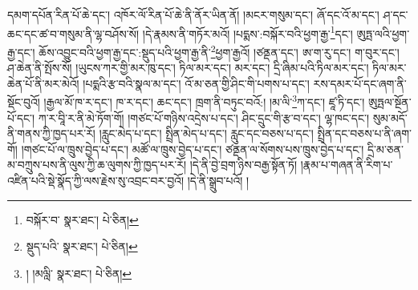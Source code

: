 དམག་དཔོན་རིན་པོ་ཆེ་དང་། འཁོར་ལོ་རིན་པོ་ཆེ་ནི་ནོར་ཡིན་ནོ། །མངར་གསུམ་དང་། ཞོ་དང་འོ་མ་དང་། ཤ་དང་ཆང་དང་ཚ་བ་གསུམ་ནི་ལྷ་བཤོས་སོ། །དེ་རྣམས་ནི་གཏོར་མའོ། །པདྨས་:བསྐོར་བའི་ཕྱག་རྒྱ་\footnote{བསྐོར་བ་  སྣར་ཐང་།  པེ་ཅིན། }དང་། ཨུཏྤ་ལའི་ཕྱག་རྒྱ་དང་། ཆོས་འབྱུང་བའི་ཕྱག་རྒྱ་དང་:སྡུད་པའི་ཕྱག་རྒྱ་ནི་\footnote{སྡུད་པའི་  སྣར་ཐང་།  པེ་ཅིན། }ཕྱག་རྒྱའོ། །ཙནྡན་དང་། ཨ་ག་རུ་དང་། ག་བུར་དང་། ཤ་ཆེན་ནི་སྤོས་སོ། །ཡུངས་ཀར་གྱི་མར་ཁུ་དང་། ཏིལ་མར་དང་། མར་དང་། དྲི་ཞིམ་པའི་ཏིལ་མར་དང་། ཏིལ་མར་ཆེན་པོ་ནི་མར་མེའོ། །པདྨའི་རྩ་བའི་སྣལ་མ་དང་། འོ་མ་ཅན་གྱི་ཤིང་གི་པགས་པ་དང་། རས་དམར་པོ་དང་ཞག་ནི་སྡོང་བུའོ། །རྒྱལ་མོ་ཁ་ར་དང་། ཁ་ར་དང་། ཆང་དང་། ཁྲག་ནི་བཏུང་བའོ:། །མ་ལི་\footnote{། །མལླི་  སྣར་ཐང་།  པེ་ཅིན། }ཀ་དང་། ཛཱ་ཏི་དང་། ཨུཏྤལ་སྔོན་པོ་དང་། ཀ་ར་བཱི་ར་ནི་མེ་ཏོག་གོ། །གཙང་པོ་གཉིས་འདྲེས་པ་དང་། ཤིང་དྲུང་གི་རྩ་བ་དང་། ལྷ་ཁང་དང་། སུམ་མདོ་ནི་གནས་ཀྱི་ཁྱད་པར་རོ། །རླུང་མེད་པ་དང་། སྤྲིན་མེད་པ་དང་། རླུང་དང་བཅས་པ་དང་། སྤྲིན་དང་བཅས་པ་ནི་ཞག་གོ། །གཙང་པོ་ལ་ཁྲུས་བྱེད་པ་དང་། མཚོ་ལ་ཁྲུས་བྱེད་པ་དང་། ཙནྡན་ལ་སོགས་པས་ཁྲུས་བྱེད་པ་དང་། དྲི་མ་ཅན་མ་བཀྲུས་པས་ནི་ལུས་ཀྱི་ཆ་ལུགས་ཀྱི་ཁྱད་པར་རོ། །དེ་ནི་བྱེ་བྲག་ཉིས་བརྒྱ་སྟོན་ཏོ། །རྣམ་པ་གཞན་ནི་རིག་པ་འཛིན་པའི་སྡེ་སྣོད་ཀྱི་ལས་རྗེས་སུ་འབྲང་བར་བྱའོ། །དེ་ནི་སྒྲུབ་པའོ། །
